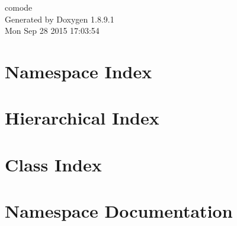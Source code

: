 \documentclass[twoside]{book}
\newcommand{\+}{\discretionary{\mbox{\scriptsize$\hookleftarrow$}}{}{}}
\newcommand{\clearemptydoublepage}{%
  \newpage{\pagestyle{empty}\cleardoublepage}%
}
\begin{document}
\hypersetup{pageanchor=false,
             bookmarks=true,
             bookmarksnumbered=true,
             pdfencoding=unicode
            }
\begin{titlepage}
\vspace*{7cm}
\begin{center}%
{\Large comode }\\
\vspace*{1cm}
{\large Generated by Doxygen 1.8.9.1}\\
\vspace*{0.5cm}
{\small Mon Sep 28 2015 17:03:54}\\
\end{center}
\end{titlepage}
\clearemptydoublepage
\tableofcontents
\clearemptydoublepage
{}
\hypersetup{pageanchor=true}

\chapter{Namespace Index}

\chapter{Hierarchical Index}

\chapter{Class Index}

\chapter{Namespace Documentation}

\end{document}
